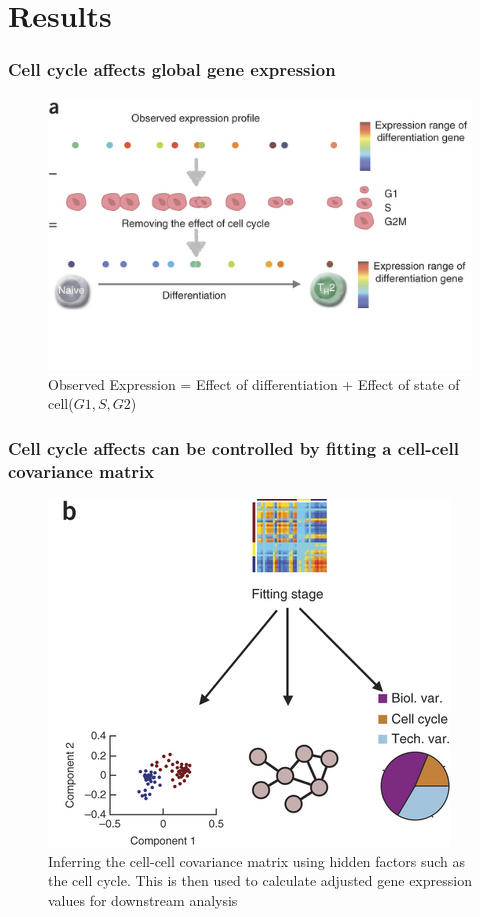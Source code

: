 \documentclass[10pt, compress]{beamer}
\renewcommand{\(}{\begin{columns}}
\renewcommand{\)}{\end{columns}}
\newcommand{\<}[1]{\begin{column}{#1}}
\renewcommand{\>}{\end{column}}
\begin{document}
\section{Results}
\begin{frame}
\frametitle{Cell cycle affects global gene expression}
\begin{figure}
\includegraphics[width=0.8\linewidth]{images/expression.jpg}
\caption{Observed Expression = Effect of differentiation + Effect of state of cell($G1,  S , G2$)}
\end{figure}
\end{frame}

\begin{frame}
\frametitle{Cell cycle affects can be controlled by fitting a cell-cell covariance matrix}
\begin{figure}
\includegraphics[width=0.5\linewidth]{images/fitting.jpg}
\caption{Inferring the cell-cell covariance matrix using hidden factors such as the cell cycle. This is then used to calculate adjusted
gene expression values for downstream analysis}
\end{figure}
\end{frame}
\end{document}
